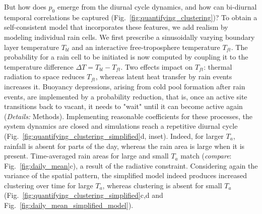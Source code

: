 \documentclass[draft,linenumbers]{agujournal2019}
\begin{document}
But how does $p_0$ emerge from the diurnal cycle dynamics, and how can bi-diurnal temporal correlations be captured (Fig.~\ref{fig:quantifying_clustering})?
To obtain a self-consistent model that incorporates these features, we add realism by modeling individual rain cells.
We first prescribe a sinusoidally varying boundary layer temperature $T_{bl}$ and an interactive free-troposphere temperature $T_{ft}$.
The probability for a rain cell to be initiated is now computed by coupling it to the temperature difference $\Delta T=T_{bl}-T_{ft}$.
Two effects impact on $T_{ft}$: 
thermal radiation to space reduces $T_{ft}$, whereas latent heat transfer by rain events increases it.
Buoyancy depressions, arising from cold pool formation after rain events, are implemented by a probability reduction, that is, once an active site transitions back to vacant, it needs to "wait" until it can become active again 
({\it Details:} Methods).
Implementing reasonable coefficients for these processes, the system dynamics are closed and simulations reach a repetitive diurnal cycle (Fig.~\ref{fig:quantifying_clustering_simplified}d, inset).
Indeed, for larger $T_a$, rainfall is absent for parts of the day, whereas the rain area is large when it is present. 
Time-averaged rain areas for large and small $T_a$ match ({\it compare}: Fig.~\ref{fig:daily_mean}c), a result of the radiative constraint.
Considering again the variance of the spatial pattern, the simplified model indeed produces increased clustering over time for large $T_a$, whereas clustering is absent for small $T_a$ (Fig.~\ref{fig:quantifying_clustering_simplified}c,d and Fig.~\ref{fig:daily_mean_simplified_model}).
\end{document}
